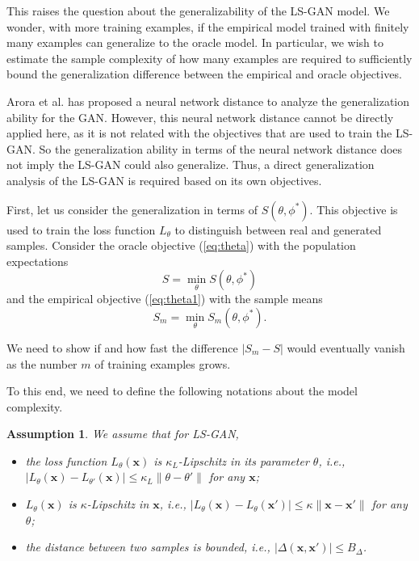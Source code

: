 \documentclass[11pt,fullpage, letterpaper,twoside]{article}
\newtheorem{assumption}{Assumption}
\newcommand{\1}[1]{\mathds{1}_{\left[#1\right]}}
\begin{document}
This raises the question about the generalizability of the LS-GAN model.  We wonder, with more training examples, if the empirical model trained with finitely many examples can generalize to the oracle model. In particular, we wish to estimate the sample complexity of how many examples are required to sufficiently bound the generalization difference between the empirical and oracle objectives.



Arora et al. \cite{arora2017generalization} has proposed a neural network distance to analyze the generalization ability for the GAN. However, this neural network distance cannot be directly applied here, as it is not related with the objectives that are used to train the LS-GAN. So the generalization ability in terms of the neural network distance does not imply the LS-GAN could also generalize. Thus, a direct generalization analysis of the LS-GAN is required based on its own objectives.

First, let us consider the generalization in terms of $S(\theta,\phi^*)$.
This objective is used to train the loss function $L_\theta$ to distinguish between real and generated samples.
Consider the oracle objective  (\ref{eq:theta}) with the population expectations
$$
S=\min_\theta S(\theta,\phi^*)
$$
and the empirical objective (\ref{eq:theta1}) with the sample means
$$
S_m=\min_\theta S_m(\theta,\phi^*).
$$


We need to show if and how fast the difference $|S_m-S|$ would eventually vanish as the number $m$ of training examples grows.


To this end, we need to define the following notations about the model complexity.
\begin{assumption}\label{asp:loss}
We assume that for LS-GAN,
\begin{itemize}
\item[I.] the loss function $L_\theta(\mathbf x)$ is $\kappa_L$-Lipschitz in its parameter $\theta$, i.e., $|L_\theta(\mathbf x)-L_{\theta'}(\mathbf x)|\leq \kappa_L\|\theta-\theta'\|$ for any $\mathbf x$;
\item[II.] $L_\theta(\mathbf x)$ is $\kappa$-Lipschitz in $\mathbf x$, i.e., $|L_\theta(\mathbf x)-L_\theta(\mathbf x')|\leq\kappa\|\mathbf x-\mathbf x'\|$ for any $\theta$;
\item[III.] the distance between two samples is bounded, i.e., $|\Delta(\mathbf x, \mathbf x')|\leq B_\Delta$.
\end{itemize}
\end{assumption}
\end{document}
